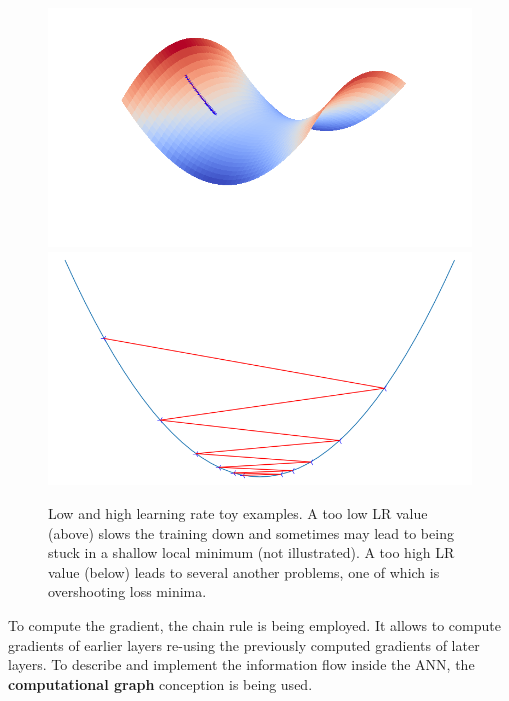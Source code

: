 \documentclass[thesis=B,english]{FITthesis}[2019/12/23]
\begin{document}
	\begin{figure}[h]
		\includegraphics[width=\textwidth]{images/low_lr.png}
		\includegraphics[width=\textwidth]{images/high_lr.png}
		\centering
		\caption{Low and high learning rate toy examples. A too low LR value (above) slows the training down and sometimes may lead to being stuck in a shallow local minimum (not illustrated). A too high LR value (below) leads to several another problems, one of which is overshooting loss minima.}
	\end{figure}
	
	To compute the gradient, the chain rule\cite{chain_rule} is being employed. It allows to compute gradients of earlier layers re-using the previously computed gradients of later layers. To describe and implement the information flow inside the ANN, the \textbf{computational graph} conception is being used.
	
\end{document}
